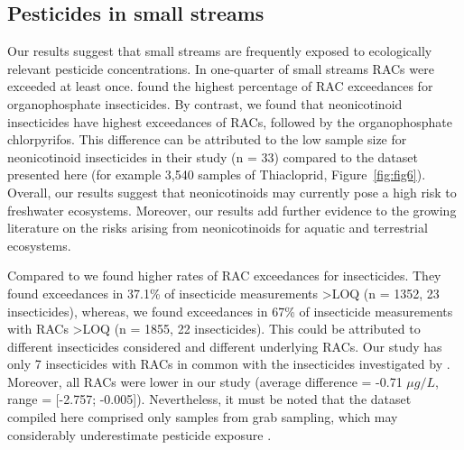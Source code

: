 \documentclass[journal=esthag,manuscript=article]{achemso}
\begin{document}
\subsection{Pesticides in small streams}
Our results suggest that small streams are frequently exposed to ecologically relevant pesticide concentrations.
In one-quarter of small streams RACs were exceeded at least once.
\citet{stehle_pesticide_2015} found the highest percentage of RAC exceedances for organophosphate insecticides. 
By contrast, we found that neonicotinoid insecticides have highest exceedances of RACs, followed by the organophosphate chlorpyrifos. 
This difference can be attributed to the low sample size for neonicotinoid insecticides in their study (n = 33) compared to the dataset presented here (for example 3,540 samples of Thiacloprid, Figure~\ref{fig:fig6}). 
Overall, our results suggest that neonicotinoids may currently pose a high risk to freshwater ecosystems. 
Moreover, our results add further evidence to the growing literature on the risks arising from neonicotinoids for aquatic \citep{morrissey2015neonicotinoid} and terrestrial \citep{pisa2015effects} ecosystems. 

Compared to \citet{stehle_pesticide_2015} we found higher rates of RAC exceedances for insecticides.
They found exceedances in 37.1\% of insecticide measurements \textgreater LOQ (n = 1352, 23 insecticides), whereas, we found exceedances in 67\% of insecticide measurements with RACs \textgreater LOQ (n = 1855, 22 insecticides). 
This could be attributed to different insecticides considered and different underlying RACs.
Our study has only 7 insecticides with RACs in common with the insecticides investigated by \citet{stehle_pesticide_2015}.
Moreover, all RACs were lower in our study (average difference = -0.71 $\mu g/L$, range = [-2.757; -0.005]). 
Nevertheless, it must be noted that the dataset compiled here comprised only samples from grab sampling, which may considerably underestimate pesticide exposure \citep{stehle_probabilistic_2013, Xing_Chow_Rees_Meng_Li_Ernst_Benoy_Zha_Hewitt_2013}. 
\end{document}
